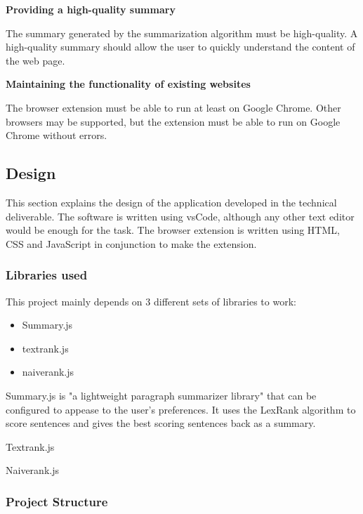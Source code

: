 \documentclass[conference,compsoc]{IEEEtran}
\begin{document}
\vspace{0.4cm}
\textbf{Providing a high-quality summary}

The summary generated by the summarization algorithm must be high-quality.
A high-quality summary should allow the user to quickly understand the content of the web page.


\vspace{0.4cm}
\textbf{Maintaining the functionality of existing websites}

The browser extension must be able to run at least on Google Chrome.
Other browsers may be supported, but the extension must be able to run on Google Chrome without errors.



\subsection{Design}


This section explains the design of the application developed in the technical deliverable.
The software is written using vsCode, although any other text editor would be enough for the task.
The browser extension is written using HTML, CSS and JavaScript in conjunction to make the extension.

\subsubsection{Libraries used}
This project mainly depends on 3 different sets of libraries to work:
\begin{itemize}
  \item Summary.js
  \item textrank.js
  \item naiverank.js
\end{itemize}

Summary.js is "a lightweight paragraph summarizer library" that can be configured to appease to the user's preferences.
It uses the LexRank algorithm to score sentences and gives the best scoring sentences back as a summary.

Textrank.js


Naiverank.js


\subsubsection{Project Structure}
\end{document}
